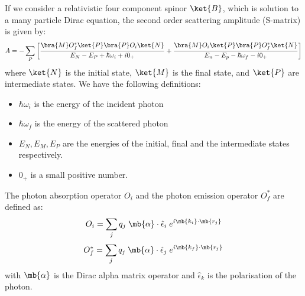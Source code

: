     If we consider a relativistic four component spinor $\ket{B}$, which
    is solution to a many particle Dirac equation, the second order
    scattering amplitude (S-matrix) is given by: 
    \begin{equation}
        A = - \sum_P
            \left[
                \frac{\bra{M} O_f^* \ket{P} \bra{P} O_i \ket{N} }
                     {E_N - E_P + \hbar \omega_i + i0_+}
                +
                \frac{\bra{M} O_i \ket{P} \bra{P} O_f^* \ket{N} }
                     {E_n - E_p - \hbar \omega_f - i0_+}
            \right]
    \end{equation}
    where $\ket{N}$ is the initial state, $\ket{M}$ is the final state,
    and $\ket{P}$ are intermediate states. We have the following
    definitions:
    \begin{itemize}
        \item $\hbar \omega_i$ is the energy of the incident photon
        \item $\hbar \omega_f$ is the energy of the scattered photon
        \item $E_N, E_M, E_P$ are the energies of the initial, final 
              and the intermediate states respectively.
        \item $0_+$ is a small positive number.             
    \end{itemize}
    The photon absorption operator $O_{i}$ and the photon emission
    operator $O_{f}^{*}$ are defined as:
    \begin{equation}
        O_i = \sum_j q_j \; \mb{\alpha} \cdot \hat{\epsilon}_i \;
              e^{i \mb{k_i} \cdot \mb{r_j} }
    \end{equation}
    \begin{equation}
        O_{f}^{*} = \sum_j q_j \; \mb{\alpha} \cdot \hat{\epsilon}_j \;
            e^{i \mb{k_f} \cdot \mb{r_j} }
    \end{equation}
    with $\mb{\alpha}$ is the Dirac alpha matrix operator and
    $\hat{\epsilon}_k$ is the polarisation of the photon.

